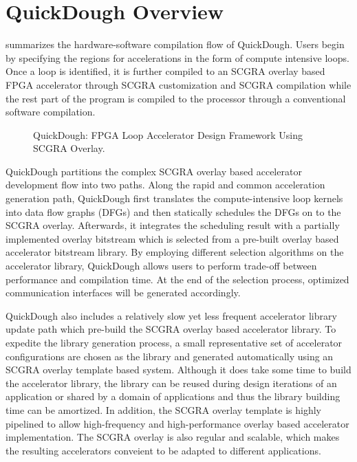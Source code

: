 \section{QuickDough Overview}
 summarizes the hardware-software compilation flow of QuickDough. Users begin by specifying the regions for accelerations in the form of compute intensive loops. Once a loop is identified, it is further compiled to an SCGRA overlay based FPGA accelerator through SCGRA customization and SCGRA compilation while the rest part of the program is compiled to the processor through a conventional software compilation.

\begin{figure}
    \caption{QuickDough: FPGA Loop Accelerator Design Framework Using SCGRA Overlay.}
    \label{fig:framework}
\end{figure}

QuickDough partitions the complex SCGRA overlay based accelerator development flow into two paths. Along the rapid and common acceleration generation path, QuickDough first translates the compute-intensive loop kernels into data flow graphs (DFGs) and then statically schedules the DFGs on to the SCGRA overlay. Afterwards, it integrates the scheduling result with a partially implemented overlay bitstream which is selected from a pre-built overlay based accelerator bitstream library. By employing different selection algorithms on the accelerator library, QuickDough allows users to perform trade-off between performance and compilation time. At the end of the selection process, optimized communication interfaces will be generated accordingly.

QuickDough also includes a relatively slow yet less frequent accelerator library update path which pre-build the SCGRA overlay based accelerator library. To expedite the library generation process, a small representative set of accelerator configurations are chosen as the library and generated automatically using an SCGRA overlay template based system. Although it does take some time to build the accelerator library, the library can be reused during design iterations of an application or shared by a domain of applications and thus the library building time can be amortized. In addition, the SCGRA overlay template is highly pipelined to allow high-frequency and high-performance overlay based accelerator implementation. The SCGRA overlay is also regular and scalable, which makes the resulting accelerators conveient to be adapted to different applications.  

